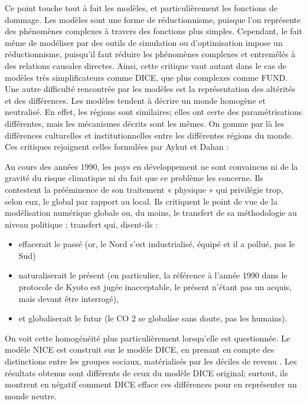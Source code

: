 Ce point touche tout à fait les modèles, et particulièrement les fonctions de dommage. Les modèles sont une forme de réductionnisme, puisque l'on représente des phénomènes complexes à travers des fonctions plus simples. Cependant, le fait même de modéliser par des outils de simulation ou d'optimisation impose un réductionnisme, puisqu'il faut réduire les phénomènes complexes et entremêlés à des relations causales directes. Ainsi, cette critique vaut autant dans le cas de modèles très simplificateurs comme DICE, que plus complexes comme FUND.   \\


Une autre difficulté rencontrée par les modèles est la représentation des altérités et des différences. Les modèles tendent à décrire un monde homogène et neutralisé. En effet, les régions sont similaires; elles ont certe des paramétrisations différentes, mais les mécanismes décrits sont les mêmes. On gomme par là les différences culturelles et institutionnelles entre les différentes régions du monde. \\

Ces critiques rejoignent celles formulées par Aykut et Dahan : 

\begin{authoredquote}
    Au cours des années 1990, les pays en développement ne sont convaincus ni de la gravité du risque climatique ni du fait que ce problème les concerne. Ils contestent la prééminence de son traitement « physique » qui privilégie trop, selon eux, le global par rapport au local. Ils critiquent le point de vue de la modélisation numérique globale ou, du moins, le transfert de sa méthodologie au niveau politique ; transfert qui, disent-ils :  
    \begin{itemize}
        \item effacerait le passé (or, le Nord s’est industrialisé, équipé et il a pollué, pas le Sud)
	    \item naturaliserait le présent (en particulier, la référence à l’année 1990 dans le protocole de Kyoto est jugée inacceptable, le présent n’étant pas un acquis, mais devant être interrogé),
	   \item et globaliserait le futur (le CO 2 se globalise sans doute, pas les humains).
    \end{itemize}
\end{authoredquote}

On voit cette homogénéité plus particulièrement lorsqu'elle est questionnée. Le modèle NICE est construit sur le modèle DICE, en prenant en compte des distinctions entre les groupes sociaux, matérialisés par les déciles de revenu \autocite{dennig_inequality_2015}. Les résultats obtenus sont différents de ceux du modèle DICE original; surtout, ils montrent en négatif comment DICE efface ces différences pour en représenter un monde neutre. 

